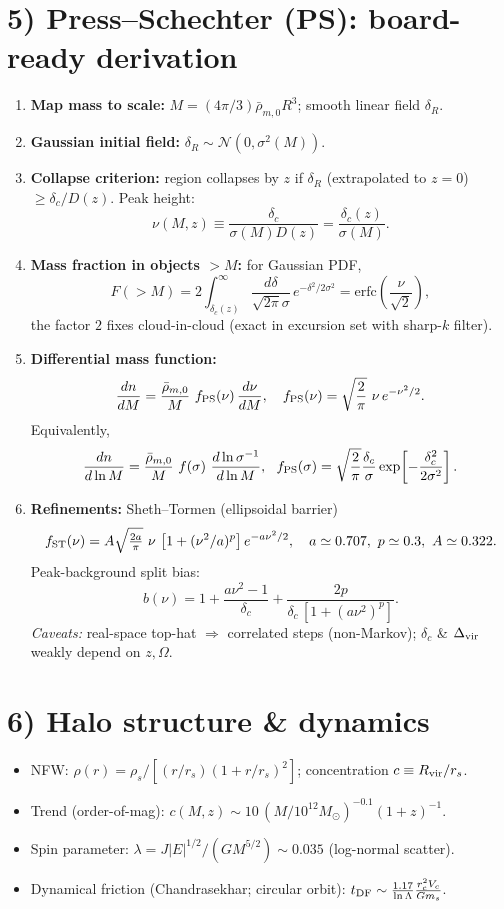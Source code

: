 \documentclass[11pt,a4paper]{article}
\begin{document}
\section*{5) Press--Schechter (PS): board-ready derivation}
\begin{enumerate}[leftmargin=*]
\item \textbf{Map mass to scale:} $M=(4\pi/3)\bar\rho_{m,0}R^3$; smooth linear field $\delta_R$.
\item \textbf{Gaussian initial field:} $\delta_R\sim \mathcal{N}(0,\sigma^2(M))$.
\item \textbf{Collapse criterion:} region collapses by $z$ if $\delta_R$ (extrapolated to $z=0$) $\ge \delta_c/D(z)$. Peak height:
\[
\nu(M,z)\equiv\frac{\delta_c}{\sigma(M)D(z)}=\frac{\delta_c(z)}{\sigma(M)}.
\]
\item \textbf{Mass fraction in objects $>M$:} for Gaussian PDF,
\[
F(>M)=2\int_{\delta_c(z)}^\infty \frac{d\delta}{\sqrt{2\pi}\sigma}\,e^{-\delta^2/2\sigma^2}
= \mathrm{erfc}\!\left(\frac{\nu}{\sqrt{2}}\right),
\]
the factor $2$ fixes cloud-in-cloud (exact in excursion set with sharp-$k$ filter).
\item \textbf{Differential mass function:}
\[
\frac{dn}{dM}=\frac{\bar\rho_{m,0}}{M}\ f_{\rm PS}(\nu)\,\frac{d\nu}{dM},\quad
f_{\rm PS}(\nu)=\sqrt{\frac{2}{\pi}}\ \nu\,e^{-\nu^2/2}.
\]
Equivalently,
\[
\frac{dn}{d\ln M}=\frac{\bar\rho_{m,0}}{M}\ f(\sigma)\ \frac{d\ln \sigma^{-1}}{d\ln M},\ \
f_{\rm PS}(\sigma)=\sqrt{\frac{2}{\pi}}\frac{\delta_c}{\sigma}\exp\!\left[-\frac{\delta_c^2}{2\sigma^2}\right].
\]
\item \textbf{Refinements:} Sheth--Tormen (ellipsoidal barrier)
\[
f_{\rm ST}(\nu)=A\sqrt{\tfrac{2a}{\pi}}\ \nu\ \big[1+(\nu^2/a)^p\big]\,e^{-a\nu^2/2},
\quad a\simeq 0.707,\ p\simeq 0.3,\ A\simeq 0.322.
\]
Peak-background split bias:
\[
b(\nu)=1+\frac{a\nu^2-1}{\delta_c}+\frac{2p}{\delta_c\,[1+(a\nu^2)^p]}.
\]
\textit{Caveats:} real-space top-hat $\Rightarrow$ correlated steps (non-Markov); $\delta_c$ \& $\Delta_{\rm vir}$ weakly depend on $z,\Omega$.
\end{enumerate}

\section*{6) Halo structure \& dynamics}
\begin{itemize}
\item NFW: $\rho(r)=\rho_s/[(r/r_s)(1+r/r_s)^2]$; concentration $c\equiv R_{\rm vir}/r_s$.
\item Trend (order-of-mag): $c(M,z)\sim 10\,(M/10^{12}M_\odot)^{-0.1}(1+z)^{-1}$.
\item Spin parameter: $\lambda=J|E|^{1/2}/(GM^{5/2})\sim 0.035$ (log-normal scatter).
\item Dynamical friction (Chandrasekhar; circular orbit): $t_{\rm DF}\sim \frac{1.17}{\ln\Lambda}\frac{r_c^2V_c}{Gm_s}$.
\end{itemize}
\end{document}
